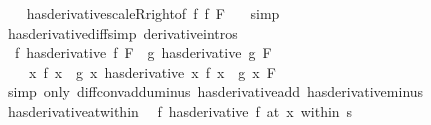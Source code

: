 \begin{isabellebody}
%
\isadelimproof
\ \ %
\endisadelimproof
%
\isatagproof
{}\isamarkupfalse%
\ has{\isacharunderscore}{\kern0pt}derivative{\isacharunderscore}{\kern0pt}scaleR{\isacharunderscore}{\kern0pt}right{\isacharbrackleft}{\kern0pt}of\ f\ f{\isacharprime}{\kern0pt}\ F\ {\isachardoublequoteopen}{\isacharminus}{\kern0pt}{}{\isachardoublequoteclose}{\isacharbrackright}{\kern0pt}\ \isamarkupfalse%
\ simp%
\endisatagproof
{\isafoldproof}%
%
\isadelimproof
\isanewline
%
\endisadelimproof
\isanewline
{}\isamarkupfalse%
\ has{\isacharunderscore}{\kern0pt}derivative{\isacharunderscore}{\kern0pt}diff{\isacharbrackleft}{\kern0pt}simp{\isacharcomma}{\kern0pt}\ derivative{\isacharunderscore}{\kern0pt}intros{\isacharbrackright}{\kern0pt}{\isacharcolon}{\kern0pt}\isanewline
\ \ {\isachardoublequoteopen}{\isacharparenleft}{\kern0pt}f\ has{\isacharunderscore}{\kern0pt}derivative\ f{\isacharprime}{\kern0pt}{\isacharparenright}{\kern0pt}\ F\ {\isasymLongrightarrow}\ {\isacharparenleft}{\kern0pt}g\ has{\isacharunderscore}{\kern0pt}derivative\ g{\isacharprime}{\kern0pt}{\isacharparenright}{\kern0pt}\ F\ {\isasymLongrightarrow}\isanewline
\ \ \ \ {\isacharparenleft}{\kern0pt}{\isacharparenleft}{\kern0pt}{\isasymlambda}x{\isachardot}{\kern0pt}\ f\ x\ {\isacharminus}{\kern0pt}\ g\ x{\isacharparenright}{\kern0pt}\ has{\isacharunderscore}{\kern0pt}derivative\ {\isacharparenleft}{\kern0pt}{\isasymlambda}x{\isachardot}{\kern0pt}\ f{\isacharprime}{\kern0pt}\ x\ {\isacharminus}{\kern0pt}\ g{\isacharprime}{\kern0pt}\ x{\isacharparenright}{\kern0pt}{\isacharparenright}{\kern0pt}\ F{\isachardoublequoteclose}\isanewline
%
\isadelimproof
\ \ %
\endisadelimproof
%
\isatagproof
{}\isamarkupfalse%
\ {\isacharparenleft}{\kern0pt}simp\ only{\isacharcolon}{\kern0pt}\ diff{\isacharunderscore}{\kern0pt}conv{\isacharunderscore}{\kern0pt}add{\isacharunderscore}{\kern0pt}uminus\ has{\isacharunderscore}{\kern0pt}derivative{\isacharunderscore}{\kern0pt}add\ has{\isacharunderscore}{\kern0pt}derivative{\isacharunderscore}{\kern0pt}minus{\isacharparenright}{\kern0pt}%
\endisatagproof
{\isafoldproof}%
%
\isadelimproof
\isanewline
%
\endisadelimproof
\isanewline
{}\isamarkupfalse%
\ has{\isacharunderscore}{\kern0pt}derivative{\isacharunderscore}{\kern0pt}at{\isacharunderscore}{\kern0pt}within{\isacharcolon}{\kern0pt}\isanewline
\ \ {\isachardoublequoteopen}{\isacharparenleft}{\kern0pt}f\ has{\isacharunderscore}{\kern0pt}derivative\ f{\isacharprime}{\kern0pt}{\isacharparenright}{\kern0pt}\ {\isacharparenleft}{\kern0pt}at\ x\ within\ s{\isacharparenright}{\kern0pt}\ {\isasymlongleftrightarrow}\isanewline

\end{isabellebody}
